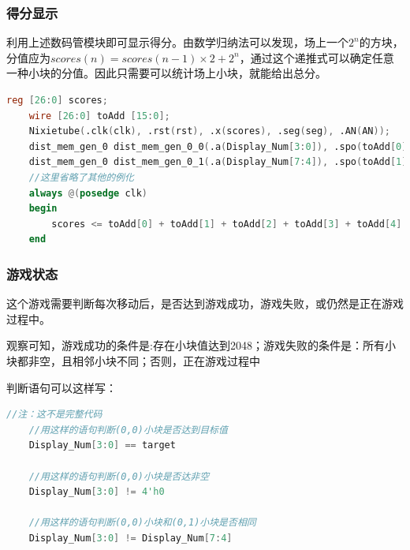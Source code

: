 \documentclass[UTF8]{article}
\begin{document}
	\subsubsection{得分显示}
	利用上述数码管模块即可显示得分。由数学归纳法可以发现，场上一个$2^{n}$的方块，分值应为$scores(n)=scores(n-1)\times 2+2^{n}$，通过这个递推式可以确定任意一种小块的分值。因此只需要可以统计场上小块，就能给出总分。\par
	\begin{lstlisting}[language=Verilog, name=得分统计]
	reg [26:0] scores;
	wire [26:0] toAdd [15:0]; 
	Nixietube(.clk(clk), .rst(rst), .x(scores), .seg(seg), .AN(AN));
	dist_mem_gen_0 dist_mem_gen_0_0(.a(Display_Num[3:0]), .spo(toAdd[0]));
	dist_mem_gen_0 dist_mem_gen_0_1(.a(Display_Num[7:4]), .spo(toAdd[1]));
	//这里省略了其他的例化
	always @(posedge clk)
	begin
		scores <= toAdd[0] + toAdd[1] + toAdd[2] + toAdd[3] + toAdd[4] + toAdd[5] + toAdd[6] + toAdd[7] + toAdd[8] + toAdd[9] + toAdd[10] + toAdd[11] + toAdd[12] + toAdd[13] + toAdd[14] + toAdd[15];
	end
	\end{lstlisting}
	\subsubsection{游戏状态}
	这个游戏需要判断每次移动后，是否达到游戏成功，游戏失败，或仍然是正在游戏过程中。\par
	观察可知，游戏成功的条件是:存在小块值达到2048；游戏失败的条件是：所有小块都非空，且相邻小块不同；否则，正在游戏过程中\par
	判断语句可以这样写：\par
	\begin{lstlisting}[language=Verilog, name=游戏状态判定部分代码]
	//注：这不是完整代码
	//用这样的语句判断(0,0)小块是否达到目标值
	Display_Num[3:0] == target
	
	//用这样的语句判断(0,0)小块是否达非空
	Display_Num[3:0] != 4'h0
	
	//用这样的语句判断(0,0)小块和(0,1)小块是否相同
	Display_Num[3:0] != Display_Num[7:4]
	\end{lstlisting}
	
	
\end{document}
